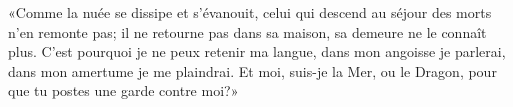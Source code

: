 «Comme la nuée se dissipe et s’évanouit,
	celui qui descend au séjour des morts n’en remonte pas;
	il ne retourne pas dans sa maison, sa demeure ne le connaît plus.
C’est pourquoi je ne peux retenir ma langue,
	dans mon angoisse je parlerai, dans mon amertume je me plaindrai.
Et moi, suis-je la Mer, ou le Dragon, pour que tu postes une garde contre moi?»
